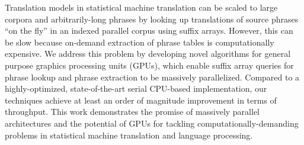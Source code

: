 Translation models in statistical machine translation can be scaled to large corpora and arbitrarily-long phrases by looking up translations of source
 phrases ``on the fly'' in an indexed parallel corpus using suffix arrays.
 However, this can be slow because on-demand extraction of phrase tables is
 computationally expensive. We address this problem by developing novel
 algorithms for general purpose graphics processing units (GPUs), which enable
 suffix array queries for phrase lookup and phrase extraction to be massively
 parallelized. Compared to a highly-optimized, state-of-the-art serial CPU-based
 implementation, our techniques achieve at least an order of magnitude
 improvement in terms of throughput. This work demonstrates the promise of
 massively parallel architectures and the potential of GPUs for tackling
 computationally-demanding problems in statistical machine translation and
 language processing.


